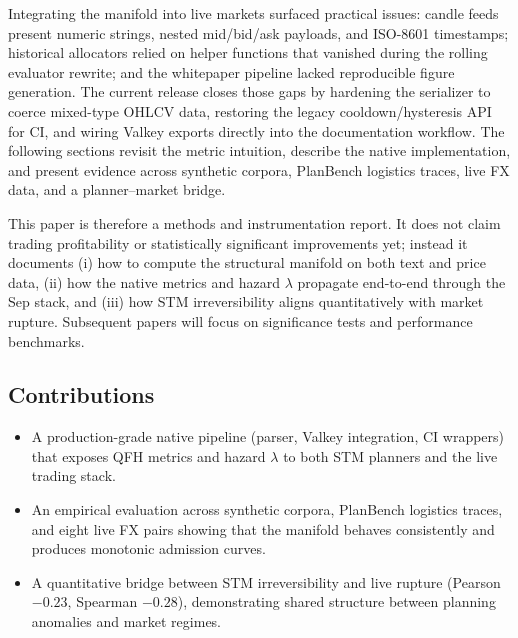 \documentclass[11pt]{article}
\begin{document}
Integrating the manifold into live markets surfaced practical issues: candle feeds present numeric strings, nested mid/bid/ask payloads, and ISO-8601 timestamps; historical allocators relied on helper functions that vanished during the rolling evaluator rewrite; and the whitepaper pipeline lacked reproducible figure generation. The current release closes those gaps by hardening the serializer to coerce mixed-type OHLCV data, restoring the legacy cooldown/hysteresis API for CI, and wiring Valkey exports directly into the documentation workflow. The following sections revisit the metric intuition, describe the native implementation, and present evidence across synthetic corpora, PlanBench logistics traces, live FX data, and a planner–market bridge.

This paper is therefore a methods and instrumentation report. It does not claim trading profitability or statistically significant improvements yet; instead it documents (i) how to compute the structural manifold on both text and price data, (ii) how the native metrics and hazard $\lambda$ propagate end-to-end through the Sep stack, and (iii) how STM irreversibility aligns quantitatively with market rupture. Subsequent papers will focus on significance tests and performance benchmarks.

\subsection*{Contributions}
\begin{itemize}
  \item A production-grade native pipeline (parser, Valkey integration, CI wrappers) that exposes QFH metrics and hazard $\lambda$ to both STM planners and the live trading stack.
  \item An empirical evaluation across synthetic corpora, PlanBench logistics traces, and eight live FX pairs showing that the manifold behaves consistently and produces monotonic admission curves.
  \item A quantitative bridge between STM irreversibility and live rupture (Pearson \(-0.23\), Spearman \(-0.28\)), demonstrating shared structure between planning anomalies and market regimes.
\end{itemize}
\end{document}
